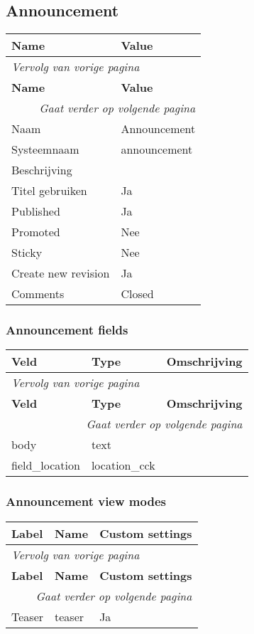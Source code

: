 \subsection{Announcement}
\label{sec:content-announcement}
  \begin{longtable}{| p{7.50cm}|p{7.50cm}|}
  \hline
  \rowcolor{tableheader}
  \textbf{Name} & \textbf{Value}  \tabularnewline
  \hline
\endfirsthead
\multicolumn{2}{l}{\textit{Vervolg van vorige pagina}} \\
\hline
\rowcolor{tableheader}
  \textbf{Name} & \textbf{Value}  \tabularnewline
  \hline
\hline
\endhead
\multicolumn{2}{r}{\textit{Gaat verder op volgende pagina}} \\
\endfoot
\hline
\endlastfoot
  Naam & Announcement  \tabularnewline
  \hline
  Systeemnaam & announcement  \tabularnewline
  \hline
  Beschrijving &   \tabularnewline
  \hline
  Titel gebruiken & Ja  \tabularnewline
  \hline
  Published & Ja  \tabularnewline
  \hline
  Promoted & Nee  \tabularnewline
  \hline
  Sticky & Nee  \tabularnewline
  \hline
  Create new revision & Ja  \tabularnewline
  \hline
  Comments & Closed  \tabularnewline
  \hline
  \end{longtable}

\subsubsection{Announcement fields}
  \begin{longtable}{| p{5.00cm}|p{5.00cm}|p{5.00cm}|}
  \hline
  \rowcolor{tableheader}
  \textbf{Veld} & \textbf{Type} & \textbf{Omschrijving}  \tabularnewline
  \hline
\endfirsthead
\multicolumn{3}{l}{\textit{Vervolg van vorige pagina}} \\
\hline
\rowcolor{tableheader}
  \textbf{Veld} & \textbf{Type} & \textbf{Omschrijving}  \tabularnewline
  \hline
\hline
\endhead
\multicolumn{3}{r}{\textit{Gaat verder op volgende pagina}} \\
\endfoot
\hline
\endlastfoot
  body & text &   \tabularnewline
  \hline
  field\_location & location\_cck &   \tabularnewline
  \hline
  \end{longtable}

\subsubsection{Announcement view modes}
  \begin{longtable}{| p{5.00cm}|p{5.00cm}|p{5.00cm}|}
  \hline
  \rowcolor{tableheader}
  \textbf{Label} & \textbf{Name} & \textbf{Custom settings}  \tabularnewline
  \hline
\endfirsthead
\multicolumn{3}{l}{\textit{Vervolg van vorige pagina}} \\
\hline
\rowcolor{tableheader}
  \textbf{Label} & \textbf{Name} & \textbf{Custom settings}  \tabularnewline
  \hline
\hline
\endhead
\multicolumn{3}{r}{\textit{Gaat verder op volgende pagina}} \\
\endfoot
\hline
\endlastfoot
  Teaser & teaser & Ja  \tabularnewline
  \hline
  \end{longtable}

